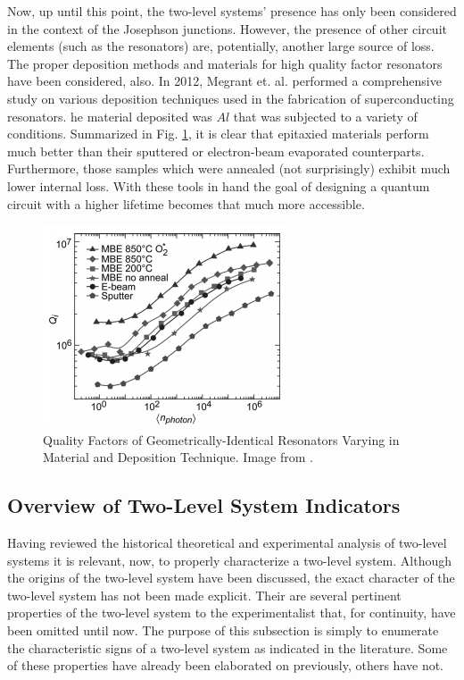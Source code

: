 \documentclass[aps,prl,reprint,groupedaddress]{revtex4-1}
\begin{document}
Now, up until this point, the two-level systems' presence has only been considered in the context of the Josephson junctions. However, the presence of other circuit elements (such as the resonators) are, potentially, another large source of loss. The proper deposition methods and materials for high quality factor resonators have been considered, also. In 2012, Megrant et. al. performed a comprehensive study on various deposition techniques used in the fabrication of superconducting resonators. he material deposited was $Al$ that was subjected to a variety of conditions. Summarized in Fig. \ref{Resons}, it is clear that epitaxied materials perform much better than their sputtered or electron-beam evaporated counterparts. Furthermore, those samples which were annealed (not surprisingly) exhibit much lower internal loss. With these tools in hand the goal of designing a quantum circuit with a higher lifetime becomes that much more accessible.

\begin{figure}%
\includegraphics[width=1.3\columnwidth,natwidth=271,natheight=226]{../DepTechsBW.png}%
\caption{Quality Factors of Geometrically-Identical Resonators Varying in Material and Deposition Technique. Image from \cite{megrant_planar_2012}.}%
\label{Resons}%
\end{figure}

\subsection{Overview of Two-Level System Indicators}
Having reviewed the historical theoretical and experimental analysis of two-level systems it is relevant, now, to properly characterize a two-level system. Although the origins of the two-level system have been discussed, the exact character of the two-level system has not been made explicit. Their are several pertinent properties of the two-level system to the experimentalist that, for continuity, have been omitted until now. The purpose of this subsection is simply to enumerate the characteristic signs of a two-level system as indicated in the literature. Some of these properties have already been elaborated on previously, others have not.
\end{document}
